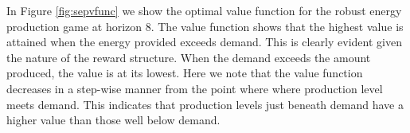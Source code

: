 
In Figure \ref{fig:sepvfunc} we show the optimal value function
for the robust energy production game at horizon 8. The value
function shows that the highest value is attained when the energy provided
exceeds demand. This is clearly evident given the nature of the reward structure.
When the demand exceeds the amount produced, the value is at its lowest.
Here we note that the value function decreases in a step-wise manner
from the point where where production level meets demand. This indicates
that production levels just beneath demand have a higher value than
those well below demand.
